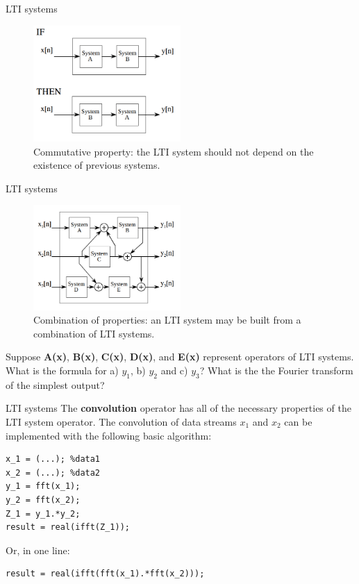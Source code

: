 \documentclass{beamer}
\begin{document}
\begin{frame}{LTI systems}
\begin{figure}
\centering
\includegraphics[width=0.5\textwidth]{figures/LTI6.png}
\caption{\label{fig:LTI6} Commutative property: the LTI system should not depend on the existence of previous systems.}
\end{figure}
\end{frame}

\begin{frame}{LTI systems}
\small
\begin{figure}
\centering
\includegraphics[width=0.5\textwidth]{figures/LTI7.png}
\caption{\label{fig:LTI7} Combination of properties: an LTI system may be built from a combination of LTI systems.}
\end{figure}
Suppose \textbf{A(x)}, \textbf{B(x)}, \textbf{C(x)}, \textbf{D(x)}, and \textbf{E(x)} represent \alert{operators} of LTI systems.  What is the formula for a) $y_1$, b) $y_2$ and c) $y_3$?  What is the the Fourier transform of the simplest output?
\end{frame}

\begin{frame}[fragile]{LTI systems}
The \textbf{convolution} operator has all of the necessary properties of the LTI system operator.  The convolution of data streams $x_1$ and $x_2$ can be implemented with the following basic algorithm:
\begin{verbatim}
x_1 = (...); %data1
x_2 = (...); %data2
y_1 = fft(x_1);
y_2 = fft(x_2);
Z_1 = y_1.*y_2;
result = real(ifft(Z_1));
\end{verbatim}
Or, in one line:
\begin{verbatim}
result = real(ifft(fft(x_1).*fft(x_2)));
\end{verbatim}
\end{frame}
\end{document}
